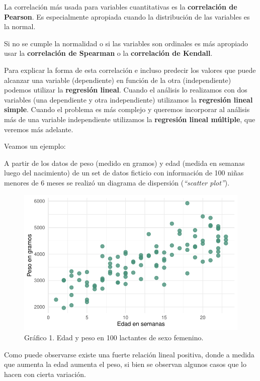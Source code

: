 \documentclass[
  letterpaper,
  DIV=11,
  numbers=noendperiod]{scrartcl}
\begin{document}
La correlación más usada para variables cuantitativas es la
\textbf{correlación de Pearson}. Es especialmente apropiada cuando la
distribución de las variables es la normal.

Si no se cumple la normalidad o si las variables son ordinales es más
apropiado usar la \textbf{correlación de Spearman} o la
\textbf{correlación de Kendall}.

Para explicar la forma de esta correlación e incluso predecir los
valores que puede alcanzar una variable (dependiente) en función de la
otra (independiente) podemos utilizar la \textbf{regresión lineal}.
Cuando el análisis lo realizamos con dos variables (una dependiente y
otra independiente) utilizamos la \textbf{regresión lineal simple}.
Cuando el problema es más complejo y queremos incorporar al análisis más
de una variable independiente utilizamos la \textbf{regresión lineal
múltiple}, que veremos más adelante.

Veamos un ejemplo:

A partir de los datos de peso (medido en gramos) y edad (medida en
semanas luego del nacimiento) de un set de datos ficticio con
información de 100 niñas menores de 6 meses se realizó un diagrama de
dispersión (\emph{``scatter plot''}).

\begin{figure}[H]

{\centering \includegraphics{index_files/figure-pdf/unnamed-chunk-4-1.pdf}

}

\caption{Gráfico 1. Edad y peso en 100 lactantes de sexo femenino.}

\end{figure}%

Como puede observarse existe una fuerte relación lineal positiva, donde
a medida que aumenta la edad aumenta el peso, si bien se observan
algunos casos que lo hacen con cierta variación.
\end{document}
